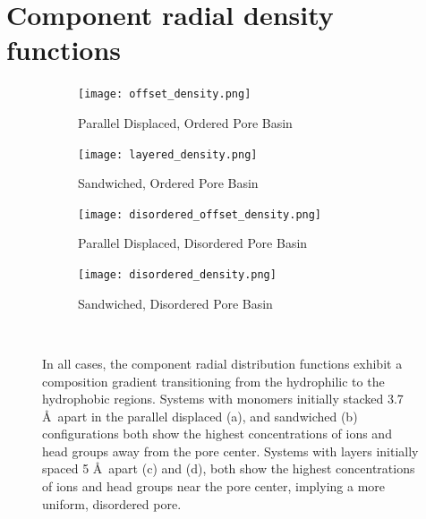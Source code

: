 \documentclass{article}
\begin{document}
  \newpage

  \section{Component radial density functions}\label{section:radial_density}
  \begin{figure}[!htb]
  \centering
  \begin{subfigure}{0.47\textwidth}
        \texttt{[image: offset\_density.png]}
        \caption{Parallel Displaced, Ordered Pore Basin}
        \label{fig:offset_density}
  \end{subfigure}
  \begin{subfigure}{0.47\textwidth}
        \texttt{[image: layered\_density.png]}
        \caption{Sandwiched, Ordered Pore Basin}
        \label{fig:layered_density}
  \end{subfigure}
  \begin{subfigure}{0.47\textwidth}
        \texttt{[image: disordered\_offset\_density.png]}
        \caption{Parallel Displaced, Disordered Pore Basin}
        \label{fig:disordered_offset_density}
  \end{subfigure}
  \begin{subfigure}{0.47\textwidth}
        \texttt{[image: disordered\_density.png]}
        \caption{Sandwiched, Disordered Pore Basin}
        \label{fig:disorder_layered_density}
  \end{subfigure}
  \caption{In all cases, the component radial distribution functions exhibit a
	  composition gradient transitioning from the hydrophilic to the hydrophobic
	  regions. Systems with monomers initially stacked 3.7 \AA~apart in the parallel
	  displaced (a), and sandwiched (b) configurations both show the highest
	  concentrations of ions and head groups away from the pore center. Systems with
	  layers initially spaced 5 \AA~apart (c) and (d), both show the highest
	  concentrations of ions and head groups near the pore center, implying a more
	  uniform, disordered pore.}~\label{fig:densities}
  \end{figure}
  \clearpage
\end{document}
